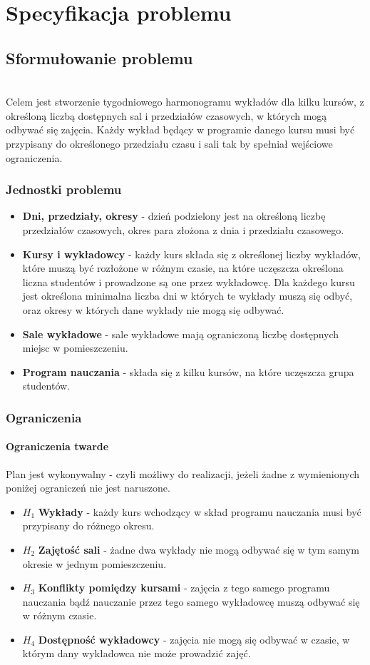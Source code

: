 \documentclass[11pt]{report}
\begin{document}
\chapter{Specyfikacja problemu}
\section{Sformułowanie problemu}
\author{Katarzyna Śmietanka} \\
Celem jest stworzenie tygodniowego harmonogramu wykładów dla kilku kursów, z określoną liczbą dostępnych sal i przedziałów czasowych, w których mogą odbywać się zajęcia. Każdy wykład będący w programie danego kursu musi być przypisany do określonego przedziału czasu i sali tak by spełniał wejściowe ograniczenia. 
\subsection{Jednostki problemu}
\begin{itemize}
\item{\textbf{Dni, przedziały, okresy} - dzień podzielony jest na określoną liczbę przedziałów czasowych, okres para złożona z dnia i przedziału czasowego.}
\item{\textbf{Kursy i wykładowcy} - każdy kurs składa się z określonej liczby wykładów, które muszą być rozłożone w różnym czasie, na które uczęszcza określona liczna studentów i prowadzone są one przez wykładowcę. Dla każdego kursu jest określona minimalna liczba dni w których te wykłady muszą się odbyć, oraz okresy w których dane wykłady nie mogą się odbywać.}
\item{\textbf{Sale wykładowe} - sale wykładowe mają ograniczoną liczbę dostępnych miejsc w pomieszczeniu.}
\item{\textbf{Program nauczania} - składa się z kilku kursów, na które uczęszcza grupa studentów.}
\end{itemize}
\subsection{Ograniczenia}
\subsubsection{Ograniczenia twarde}
Plan jest wykonywalny - czyli możliwy do realizacji, jeżeli żadne z wymienionych poniżej ograniczeń nie jest naruszone.
\begin{itemize}
\item  ${H_{1}}$ \textbf{Wykłady} - każdy kurs wchodzący w skład programu nauczania musi być przypisany do różnego okresu.
\item  ${H_{2}}$ \textbf{Zajętość sali} - żadne dwa wykłady nie mogą odbywać się w tym samym okresie w jednym pomieszczeniu.
\item  ${H_{3}}$ \textbf{Konflikty pomiędzy kursami} - zajęcia z tego samego programu nauczania bądź nauczanie przez tego samego wykładowcę muszą odbywać się w różnym czasie.
\item  ${H_{4}}$ \textbf{Dostępność wykładowcy} - zajęcia nie mogą się odbywać w czasie, w którym dany wykładowca nie może prowadzić zajęć.
\end{itemize}
\end{document}

